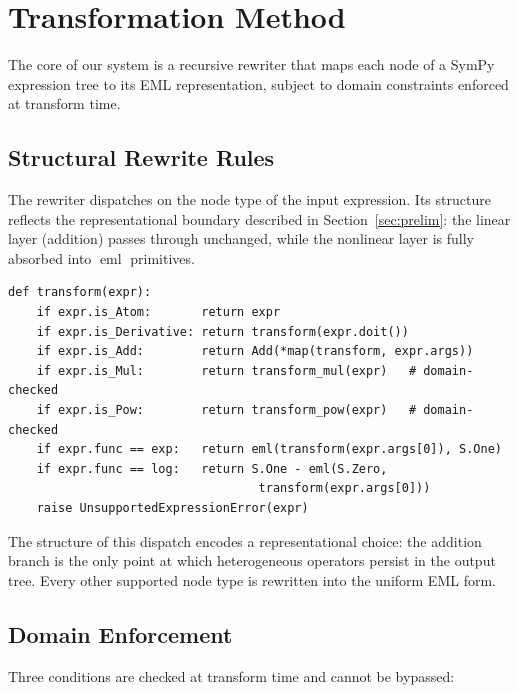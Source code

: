 \documentclass[11pt,a4paper]{article}
\newcommand{\eml}{\operatorname{eml}}
\begin{document}
\section{Transformation Method}
\label{sec:method}

The core of our system is a recursive rewriter that maps each node of a
SymPy expression tree to its EML representation, subject to domain
constraints enforced at transform time.

\subsection{Structural Rewrite Rules}

The rewriter dispatches on the node type of the input expression. Its
structure reflects the representational boundary described in
Section~\ref{sec:prelim}: the linear layer (addition) passes through
unchanged, while the nonlinear layer is fully absorbed into $\eml$
primitives.

\begin{lstlisting}[caption={Recursive transformation dispatch.},
                   label={lst:transform}]
def transform(expr):
    if expr.is_Atom:       return expr
    if expr.is_Derivative: return transform(expr.doit())
    if expr.is_Add:        return Add(*map(transform, expr.args))
    if expr.is_Mul:        return transform_mul(expr)   # domain-checked
    if expr.is_Pow:        return transform_pow(expr)   # domain-checked
    if expr.func == exp:   return eml(transform(expr.args[0]), S.One)
    if expr.func == log:   return S.One - eml(S.Zero,
                                   transform(expr.args[0]))
    raise UnsupportedExpressionError(expr)
\end{lstlisting}

The structure of this dispatch encodes a representational choice: the
addition branch is the only point at which heterogeneous operators
persist in the output tree. Every other supported node type is rewritten
into the uniform EML form.

\subsection{Domain Enforcement}

Three conditions are checked at transform time and cannot be bypassed:
\end{document}
